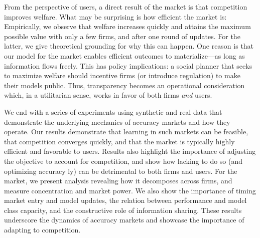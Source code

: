 From the perspective of users, a direct result of the market is that competition improves welfare.
What may be surprising is how efficient the market is:
Empirically, we observe that welfare increases quickly and attains the maximum possible value with only a few firms,
and after one round of updates.
For the latter, we give theoretical grounding for why this can happen.
One reason is that our model for the market enables efficient outcomes to materialize---as long as information flows freely.
This has policy implications:
a social planner that seeks to maximize welfare should incentive firms
(or introduce regulation) to make their models public.
%
Thus, transparency becomes an operational consideration 
which, in a utilitarian sense,
works in favor of both firms \emph{and} users.

We end with a series of experiments using synthetic and real data 
that demonstrate the underlying mechanics of accuracy markets and how they operate.
Our results demonstrate that learning in such markets can be feasible,
that competition converges quickly, and that the market is typically highly efficient and favorable to users.
Results also highlight the importance of adjusting the objective to account for competition, and show how lacking to do so (and optimizing accuracy {\naive}ly) 
can be detrimental to both firms and users.
For the market, we present analysis revealing how it
decomposes across firms, and measure concentration and market power.
We also show the importance of timing market entry and model updates,
the relation between performance and model class capacity,
and the constructive role of information sharing.
These results underscore the dynamics of accuracy  markets and showcase the importance of adapting to competition.
\squeeze


